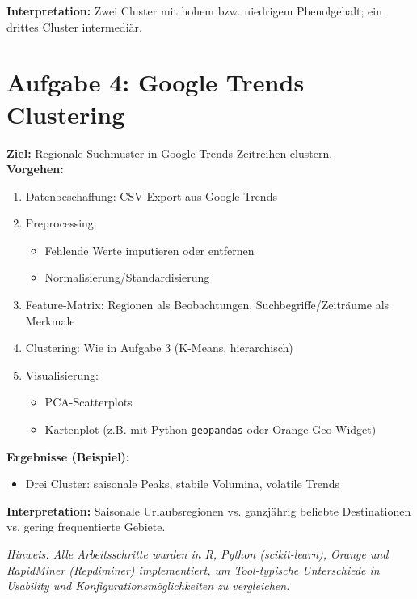 \documentclass[a4paper,12pt]{article}
\begin{document}
\textbf{Interpretation:} Zwei Cluster mit hohem bzw. niedrigem Phenolgehalt; ein drittes Cluster intermediär.

\newpage

\section*{Aufgabe 4: Google Trends Clustering}

\textbf{Ziel:} Regionale Suchmuster in Google Trends-Zeitreihen clustern.\\

\textbf{Vorgehen:}
\begin{enumerate}
  \item Datenbeschaffung: CSV-Export aus Google Trends
  \item Preprocessing:
    \begin{itemize}
      \item Fehlende Werte imputieren oder entfernen
      \item Normalisierung/Standardisierung
    \end{itemize}
  \item Feature-Matrix: Regionen als Beobachtungen, Suchbegriffe/Zeiträume als Merkmale
  \item Clustering: Wie in Aufgabe 3 (K-Means, hierarchisch)
  \item Visualisierung:
    \begin{itemize}
      \item PCA-Scatterplots
      \item Kartenplot (z.B. mit Python \lstinline|geopandas| oder Orange-Geo-Widget)
    \end{itemize}
\end{enumerate}

\textbf{Ergebnisse (Beispiel):}
\begin{itemize}
  \item Drei Cluster: saisonale Peaks, stabile Volumina, volatile Trends
\end{itemize}

\textbf{Interpretation:} Saisonale Urlaubsregionen vs. ganzjährig beliebte Destinationen vs. gering frequentierte Gebiete.

\vspace{1em}
\noindent\textit{Hinweis: Alle Arbeitsschritte wurden in R, Python (scikit-learn), Orange und RapidMiner (Repdiminer) implementiert, um Tool-typische Unterschiede in Usability und Konfigurationsmöglichkeiten zu vergleichen.}
\end{document}
